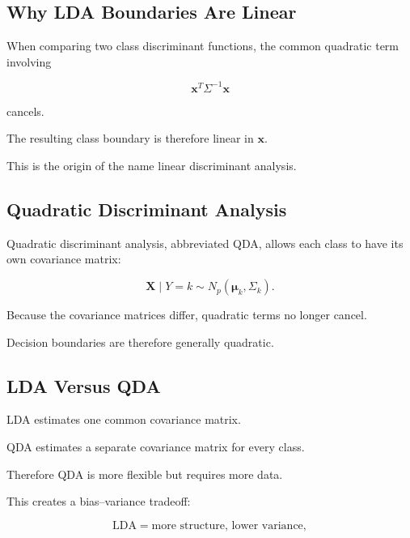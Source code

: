 \subsection{Why LDA Boundaries Are Linear}
\label{subsec:why-lda-linear}

When comparing two class discriminant functions, the common quadratic
term involving

\[
\mathbf{x}^T\Sigma^{-1}\mathbf{x}
\]

cancels.

The resulting class boundary is therefore linear in \(\mathbf{x}\).

This is the origin of the name linear discriminant analysis.

\subsection{Quadratic Discriminant Analysis}
\label{subsec:quadratic-discriminant-analysis}

Quadratic discriminant analysis, abbreviated QDA, allows each class to
have its own covariance matrix:

\[
\boxed{
\mathbf{X}
\mid
Y=k
\sim
N_p
(
\boldsymbol{\mu}_k,
\Sigma_k
).
}
\]

Because the covariance matrices differ, quadratic terms no longer cancel.

Decision boundaries are therefore generally quadratic.

\subsection{LDA Versus QDA}
\label{subsec:lda-versus-qda}

LDA estimates one common covariance matrix.

QDA estimates a separate covariance matrix for every class.

Therefore QDA is more flexible but requires more data.

This creates a bias--variance tradeoff:

\[
\boxed{
\text{LDA}
=
\text{more structure, lower variance},
}
\]

